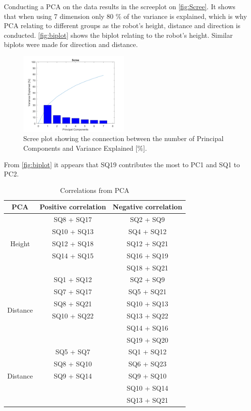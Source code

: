 \noindent
Conducting a PCA on the data results in the screeplot on \autoref{fig:Scree}. It shows that when using 7 dimension only 80 \% of the variance is explained, which is why PCA relating to different groups as the robot's height, distance and direction is conducted. \autoref{fig:biplot} shows the biplot relating to the robot's height. Similar biplots were made for direction and distance.
%
\begin{figure}[H]
	\centering
	\includegraphics[width = 0.49\textwidth]{Figure/Scree.png}
	\setlength{} 
	\caption{Scree plot showing the connection between the number of Principal Components and Variance Explained [\%].}
	\label{fig:Scree}
\end{figure}
\noindent
%
From \autoref{fig:biplot} it appears that SQ19 contributes the most to PC1 and SQ1 to PC2. 
%
\begin{table}[H]
	\centering
	\caption{Correlations from PCA}
	\label{tab:CorrelationsFromPCA} 
	\begin{tabular}{ c|c|c }
		\centering
		PCA & Positive correlation & Negative correlation \\ \hline
		\multirow{5}{*}{Height} & SQ8 + SQ17 & SQ2 + SQ9 \\
		& SQ10 + SQ13 & SQ4 + SQ12 \\
		& SQ12 + SQ18 & SQ12 + SQ21 \\
		& SQ14 + SQ15 & SQ16 + SQ19 \\
		&  & SQ18 + SQ21\\ \hline
		\multirow{6}{*}{Distance} & SQ1 + SQ12 & SQ2 + SQ9 \\
		& SQ7 + SQ17 & SQ5 + SQ21 \\
		& SQ8 + SQ21 & SQ10 + SQ13 \\
		& SQ10 + SQ22 & SQ13 + SQ22 \\
		&  & SQ14 + SQ16 \\	
		&  & SQ19 + SQ20 \\ \hline	
		\multirow{5}{*}{Distance} & SQ5 + SQ7 & SQ1 + SQ12 \\
		& SQ8 + SQ10 & SQ6 + SQ23 \\
		& SQ9 + SQ14 & SQ9 + SQ10 \\
		&  & SQ10 + SQ14 \\
		&  & SQ13 + SQ21 
	\end{tabular}        
\end{table}
